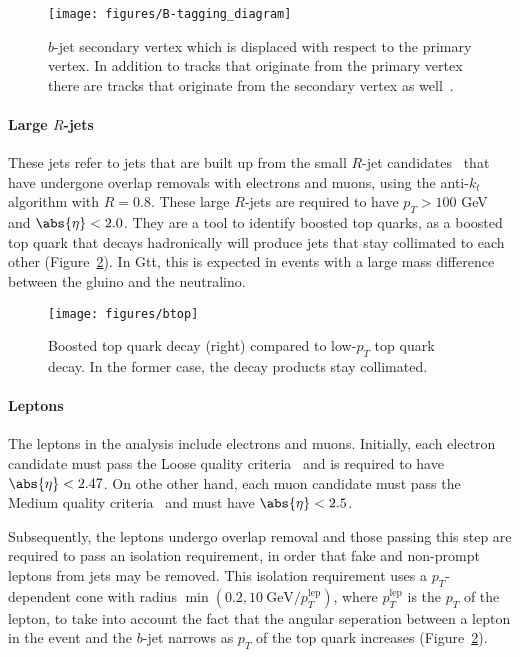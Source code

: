 \begin{figure}[H]
	\texttt{[image: figures/B-tagging\_diagram]}
	\centering

	\caption{$b$-jet secondary vertex which is displaced with respect to the
		primary vertex. In addition to tracks that originate from the primary vertex
		there are tracks that originate from the secondary vertex as
		well~\cite{bjetwiki}.}

	\label{f:btagging}
\end{figure}


\paragraph{Large $R$-jets} These jets refer to jets that are built up from the
small $R$-jet candidates~\cite{Nachman:2014kla} that have undergone overlap
removals with electrons and muons, using the anti-$k_t$ algorithm with $R=0.8$.
These large $R$-jets are required to have $p_T > 100$ GeV and $\abs{\eta} <
	2.0$. They are a tool to identify boosted top quarks, as a boosted top quark
that decays hadronically will produce jets that stay collimated to each other
(Figure~\ref{f:boostedtop}). In Gtt, this is expected in events with a large
mass difference between the gluino and the neutralino.


\begin{figure}[H]
	\texttt{[image: figures/btop]}
	\centering

	\caption{Boosted top quark decay (right) compared to low-$p_T$ top quark
		decay. In the former case, the decay products stay collimated.}

	\label{f:boostedtop}
\end{figure}


\paragraph{Leptons} The leptons in the analysis include electrons and muons.
Initially, each electron candidate must pass the Loose quality
criteria~\cite{PERF-2013-05,ATLAS-CONF-2016-024} and is required to have
$\abs{\eta} < 2.47$. On othe other hand, each muon candidate must pass the
Medium quality criteria~\cite{PERF-2015-10} and must have $\abs{\eta} < 2.5$.

Subsequently, the leptons undergo overlap removal and those passing this step
are required to pass an isolation requirement, in order that fake and
non-prompt leptons from jets may be removed. This isolation requirement uses a
$p_T$-dependent cone with radius $\min(0.2, 10~\text{GeV} / p_T^{\text{lep}})$,
where $p_T^{\text{lep}}$ is the $p_T$ of the lepton, to take into account the
fact that the angular seperation between a lepton in the event and the $b$-jet
narrows as $p_T$ of the top quark increases (Figure~\ref{f:boostedtop}).

